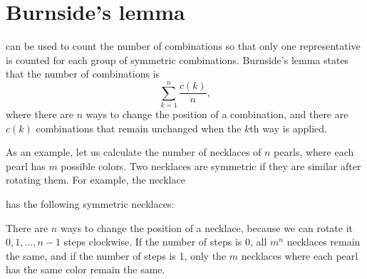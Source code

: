 \section{Burnside's lemma}


can be used to count
the number of combinations so that
only one representative is counted
for each group of symmetric combinations.
Burnside's lemma states that the number of
combinations is
\[\sum_{k=1}^n \frac{c(k)}{n},\]
where there are $n$ ways to change the
position of a combination,
and there are $c(k)$ combinations that
remain unchanged when the $k$th way is applied.

As an example, let us calculate the number of
necklaces of $n$ pearls,
where each pearl has $m$ possible colors.
Two necklaces are symmetric if they are
similar after rotating them.
For example, the necklace
\begin{center}
\end{center}
has the following symmetric necklaces:
\begin{center}
\end{center}
There are $n$ ways to change the position
of a necklace,
because we can rotate it
$0,1,\ldots,n-1$ steps clockwise.
If the number of steps is 0,
all $m^n$ necklaces remain the same,
and if the number of steps is 1,
only the $m$ necklaces where each
pearl has the same color remain the same.

